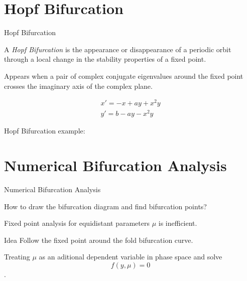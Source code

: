 \documentclass{beamer}
\begin{document}
\section{Hopf Bifurcation}
\begin{frame}{Hopf Bifurcation}
    \begin{definition}
        A \emph{Hopf Bifurcation} is the appearance or disappearance of a periodic orbit 
        through a local change in the stability properties of a fixed point.
    \end{definition}
    Appears when a pair of complex conjugate eigenvalues around the fixed point 
    crosses the imaginary axis of the complex plane.

        \begin{align}
        x' = - x + ay + x^2 y \\
        y' = b - ay - x^2 y
        \end{align}
\end{frame} 

\begin{frame}{Hopf Bifurcation example:}
\end{frame}

\section{Numerical Bifurcation Analysis}
\begin{frame}{Numerical Bifurcation Analysis}
    \begin{block}{}
        How to draw the bifurcation diagram and find bifurcation points?
    \end{block}
    Fixed point analysis for equidistant parameters $\mu$ is inefficient.
    
    \begin{block}{Idea}
        Follow the fixed point around the fold bifurcation curve.
    \end{block}
    
    Treating $\mu$ as an aditional dependent variable in phase space and solve 
    $$f(y, \mu) = 0$$. 
    
\end{frame}
\end{document}
